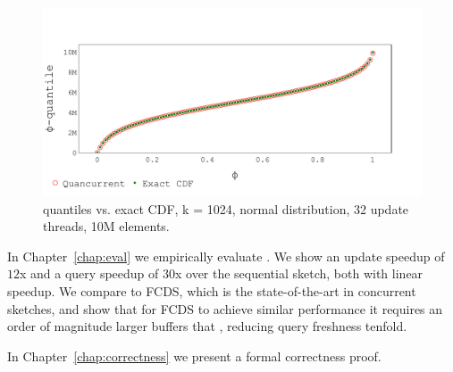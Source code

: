\begin{figure}[htp]
    \centering
    \includegraphics[width=\linewidth,trim={0cm 0.3cm 0cm 1.5cm},clip]
    {graphics/graphs/accuracy/Oracle_Quancurrent_blocking_numa_cdf_normal_k1024_b16_keys10M_runs1_uT32_qT1_snapshot1_17-09-2022_07-00-49.pdf}
    \caption{\mysketch quantiles vs. exact CDF, k = 1024, normal distribution, 32 update threads, 10M elements.}
    \label{fig:intro-query-accuracy}
\end{figure}


In Chapter~\ref{chap:eval} we empirically evaluate \mysketch. We show an update speedup of $12$x and a query speedup of $30$x over the sequential sketch, both with linear speedup. We compare \mysketch to FCDS, which is the state-of-the-art in concurrent sketches, and show that for FCDS to achieve similar performance it requires an order of magnitude larger buffers that \mysketch, reducing query freshness tenfold.

In Chapter~\ref{chap:correctness} we present a formal correctness proof. 


